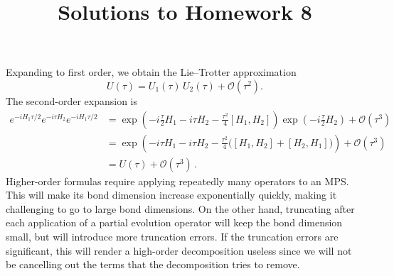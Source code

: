 \documentclass[a4paper,10pt,twoside]{article}
\def \order {\mathcal{O}}
\begin{document}
\title{\vspace{-1cm}\sffamily Solutions to Homework 8\vspace{-1cm}}
\author{}
\date{}
\maketitle
\thispagestyle{fancy}

\begin{section}{}
Expanding to first order, we obtain the Lie--Trotter approximation 
\[
  U(\tau) = U_1(\tau) \, U_2(\tau) + \order \left( \tau^2 \right) .
\]
The second-order expansion is
\begin{align*}
  e^{-i H_1 \tau/2} e^{-i\tau H_2} e^{-iH_1\tau/2} 
  &= \exp \left( -i \frac{\tau}{2} H_1 -i \tau H_2 - \frac{\tau^2}{4}[H_1,H_2] \right) \exp\left( -i\frac{\tau}{2}H_2 \right) + \order(\tau^3)  \\
  &= \exp \left( -i \tau H_1 -i \tau H_2 - \frac{\tau^2}{4} \big( [H_1,H_2]  + [H_2,H_1]\big) \right) + \order(\tau^3)    \\
  &= U(\tau) + \order(\tau^3)\,.
\end{align*}
Higher-order formulas require applying repeatedly many operators to an MPS.
This will make its bond dimension increase exponentially quickly, making it challenging to go to large bond dimensions.
On the other hand, truncating after each application of a partial evolution operator will keep the bond dimension small, but will introduce more truncation errors. 
 If the truncation errors are significant, this will render a high-order decomposition useless since we will not be cancelling out the terms that the decomposition tries to remove.
\end{section}
\end{document}
